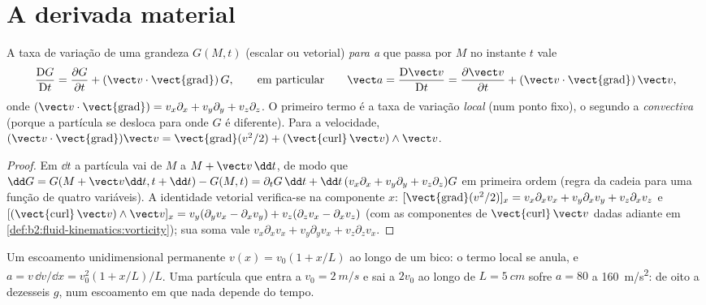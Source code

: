 \section{A derivada material}

\begin{theorem}\label{thm:b2:fluid-kinematics:material}
A taxa de variação de uma grandeza $G(M, t)$ (escalar ou vetorial) \emph{para
a } que passa por $M$ no instante $t$ vale
\[
\frac{\mathrm DG}{\mathrm Dt} = \frac{\partial G}{\partial t} + (\vect v\cdot
\operatorname{\vect{grad}})\,G ,
\qquad\text{em particular}\qquad
\vect a = \frac{\mathrm D\vect v}{\mathrm Dt} = \frac{\partial\vect v}{\partial t} +
(\vect v\cdot\operatorname{\vect{grad}})\,\vect v ,
\]
onde $(\vect v\cdot\operatorname{\vect{grad}}) = v_x\partial_x + v_y\partial_y +
v_z\partial_z$. O primeiro termo é a taxa de variação \emph{local} (num
ponto fixo), o segundo a \emph{convectiva} (porque a partícula
se desloca para onde $G$ é diferente). Para a velocidade, $(\vect v\cdot
\operatorname{\vect{grad}})\vect v = \operatorname{\vect{grad}}(v^2/2) +
(\operatorname{\vect{curl}}\vect v)\wedge\vect v$.
\end{theorem}

\begin{proof}
Em $\dd t$ a partícula vai de $M$ a $M + \vect v\,\dd t$, de modo que $\dd G =
G(M + \vect v\dd t, t + \dd t) - G(M, t) = \partial_tG\,\dd t + \dd t\,(v_x\partial_x
+ v_y\partial_y + v_z\partial_z)G$ em primeira ordem (regra da cadeia para uma função
de quatro variáveis). A identidade vetorial verifica-se na componente
$x$: $[\operatorname{\vect{grad}}(v^2/2)]_x = v_x\partial_xv_x + v_y\partial_x
v_y + v_z\partial_xv_z$ e $[(\operatorname{\vect{curl}}\vect v)\wedge\vect v]_x =
v_y(\partial_yv_x - \partial_xv_y) + v_z(\partial_zv_x - \partial_xv_z)$ (com as
componentes de $\operatorname{\vect{curl}}\vect v$ dadas adiante em
\cref{def:b2:fluid-kinematics:vorticity}); sua soma vale $v_x\partial_xv_x +
v_y\partial_yv_x + v_z\partial_zv_x$.
\end{proof}

\begin{example}\label{ex:b2:fluid-kinematics:nozzle}
Um escoamento unidimensional permanente $v(x) = v_0(1 + x/L)$ ao longo de um bico: o
termo local se anula, e $a = v\,\dd v/\dd x = v_0^2(1 + x/L)/L$. Uma
partícula que entra a $v_0 = \qty{2}{m/s}$ e sai a $2v_0$ ao longo de $L
= \qty{5}{cm}$ sofre $a = 80$ a \qty{160}{m/s^2}: de oito a dezesseis $g$, num
escoamento em que nada depende do tempo.
\end{example}

